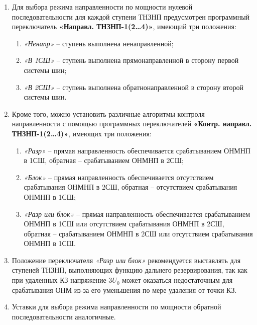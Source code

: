 \begin{enumerate}[label=\arabic{section}.\arabic{subsection}.\arabic*,  align=left, labelsep=4pt, leftmargin=0pt, itemindent=57pt]
\begin{figure}[H]
\caption{Характеристики срабатывания ОНМНП}
\label{pict_tnznp:ONMNP}
\end{figure}

\medskip

\item
Для выбора режима направленности по мощности нулевой последовательности для каждой ступени
ТНЗНП предусмотрен программный переключатель \textbf{«Направл. ТНЗНП-1(2…4)»}, имеющий три положения:
\begin{enumerate}[label=\arabic*)]
    \item \textit{«Ненапр»} -- ступень выполнена ненаправленной;
    \item \textit{«В 1СШ»} -- ступень выполнена прямонаправленной в сторону первой системы шин;
    \item \textit{«В 2СШ»} -- ступень выполнена обратнонаправленной в сторону второй системы шин.
\end{enumerate}

\item
Кроме того, можно установить различные алгоритмы контроля направленности с помощью программных
переключателей \textbf{«Контр. направл. ТНЗНП-1(2…4)»}, имеющих три положения:
\begin{enumerate}[label=\arabic*)]
    \item \textit{«Разр»} --  прямая направленность обеспечивается срабатыванием ОНМНП в 1СШ, обратная -- срабатыванием ОНМНП в 2СШ;
    \item \textit{«Блок»} -- прямая направленность обеспечивается отсутствием срабатывания ОНМНП в 2СШ, обратная -- отсутствием срабатывания ОНМНП в 1СШ;
    \item \textit{«Разр или блок»} -- прямая направленность обеспечивается срабатыванием ОНМНП в 1СШ или отсутствием срабатывания ОНМНП в 2СШ, обратная -- срабатыванием ОНМНП в 2СШ или отсутствием срабатывания ОНМНП в 1СШ.
\end{enumerate}

\item
Положение переключателя \textit{«Разр или блок»} рекомендуется выставлять для ступеней ТНЗНП,
выполняющих функцию дальнего резервирования, так как при удаленных КЗ напряжение $3U_0$ может оказаться
недостаточным для срабатывания ОНМ из-за его уменьшения по мере удаления от точки КЗ.

\item
Уставки для выбора режима направленности по мощности обратной последовательности аналогичные.


\end{enumerate}
